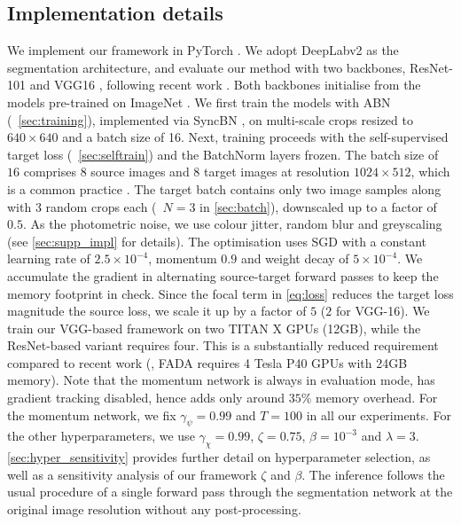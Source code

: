 \subsection{Implementation details}
We implement our framework in PyTorch \cite{NEURIPS2019_9015}.
We adopt DeepLabv2 \cite{ChenPKMY18} as the segmentation architecture, and evaluate our method with two backbones, ResNet-101 \cite{HeZRS16} and VGG16 \cite{SimonyanZ14a}, following recent work \cite{KimB20a,TsaiHSS0C18,TsaiSSC19,VuJBCP19,WangYWFXHHS20}.
Both backbones initialise from the models pre-trained on ImageNet \cite{imagenet_cvpr09}.
We first train the models with ABN \cite{LiWSHL18} (\cf~\cref{sec:training}), implemented via SyncBN \cite{NEURIPS2019_9015}, on multi-scale crops resized to $640 \times 640$ and a batch size of 16.
Next, training proceeds with the self-supervised target loss (\cf~\cref{sec:selftrain}) and the BatchNorm layers \cite{IoffeS15} frozen.
The batch size of $16$ comprises $8$ source images and $8$ target images at resolution $1024 \times 512$, which is a common practice \cite{Wang_2020_ECCV,0001S20}.
The target batch contains only two image samples along with $3$ random crops each (\ie~$N=3$ in \cref{sec:batch}), downscaled up to a factor of $0.5$.
As the photometric noise, we use colour jitter, random blur and greyscaling (see \cref{sec:supp_impl} for details).
The optimisation uses SGD with a constant learning rate of $2.5 \times 10^{-4}$, momentum $0.9$ and weight decay of $5 \times 10^{-4}$.
We accumulate the gradient in alternating source-target forward passes to keep the memory footprint in check.
Since the focal term in \cref{eq:loss} reduces the target loss magnitude \wrt the source loss, we scale it up by a factor of $5$ ($2$ for VGG-16).
We train our VGG-based framework on two TITAN X GPUs (12GB), while the ResNet-based variant requires four.
This is a substantially reduced requirement compared to recent work (\eg, FADA \cite{Wang_2020_ECCV} requires 4 Tesla P40 GPUs with 24GB memory).
Note that the momentum network is always in evaluation mode, has gradient tracking disabled, hence adds only around $35\%$ memory overhead.
For the momentum network, we fix $\gamma_\psi = 0.99$ and $T = 100$ in all our experiments.
For the other hyperparameters, we use $\gamma_\chi = 0.99$, $\zeta = 0.75$, $\beta = 10^{-3}$ and $\lambda = 3$.
\cref{sec:hyper_sensitivity} provides further detail on hyperparameter selection, as well as a sensitivity analysis of our framework \wrt $\zeta$ and $\beta$.
The inference follows the usual procedure of a single forward pass through the segmentation network at the original image resolution without any post-processing.

